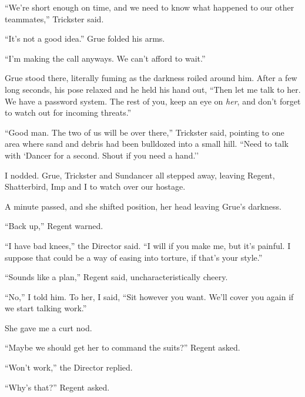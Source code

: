 ``We're short enough on time, and we need to know what happened to our other teammates,'' Trickster said.



``It's not a good idea.''  Grue folded his arms.



``I'm making the call anyways.  We can't afford to wait.''



Grue stood there, literally fuming as the darkness roiled around him.  After a few long seconds, his pose relaxed and he held his hand out, ``Then let me talk to her.  We have a password system.  The rest of you, keep an eye on \emph{her}, and don't forget to watch out for incoming threats.''



``Good man.  The two of us will be over there,'' Trickster said, pointing to one area where sand and debris had been bulldozed into a small hill.  ``Need to talk with `Dancer for a second.  Shout if you need a hand.''



I nodded.  Grue, Trickster and Sundancer all stepped away, leaving Regent, Shatterbird, Imp and I to watch over our hostage.



A minute passed, and she shifted position, her head leaving Grue's darkness.



``Back up,'' Regent warned.



``I have bad knees,'' the Director said.  ``I will if you make me, but it's painful.  I suppose that could be a way of easing into torture, if that's your style.''



``Sounds like a plan,'' Regent said, uncharacteristically cheery.



``No,'' I told him.  To her, I said, ``Sit however you want.  We'll cover you again if we start talking work.''



She gave me a curt nod.



``Maybe we should get her to command the suits?''  Regent asked.



``Won't work,'' the Director replied.



``Why's that?''  Regent asked.



